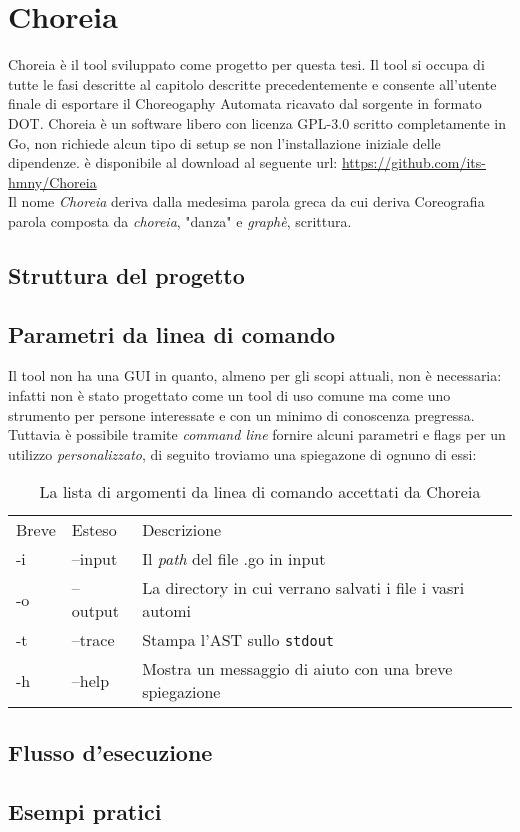 \chapter{Choreia}
Choreia è il tool sviluppato come progetto per questa tesi. Il tool si occupa di tutte le fasi descritte al capitolo descritte precedentemente e consente all'utente finale di esportare il Choreogaphy Automata ricavato dal sorgente in formato DOT.
Choreia è un software libero con licenza GPL-3.0 scritto completamente in Go, non richiede alcun tipo di setup se non l'installazione iniziale delle dipendenze. è disponibile al download al seguente url: \url{https://github.com/its-hmny/Choreia} \\
Il nome \emph{Choreia} deriva dalla medesima parola greca da cui deriva Coreografia parola composta da \emph{choreia}, "danza" e \emph{graphè}, scrittura.

\section{Struttura del progetto}

\section{Parametri da linea di comando}
Il tool non ha una GUI in quanto, almeno per gli scopi attuali, non è necessaria: infatti non è stato progettato come un tool di uso comune ma come uno strumento per persone interessate e con un minimo di conoscenza pregressa.\\
Tuttavia è possibile tramite \emph{command line} fornire alcuni parametri e flags per un utilizzo \emph{personalizzato}, di seguito troviamo una spiegazone di ognuno di essi:
\begin{table}[h!]
    \centering
    \begin{tabular}{l l l}
        Breve & Esteso   & Descrizione                                               \\
        -i    & --input  & Il \emph{path} del file .go in input                      \\
        -o    & --output & La directory in cui verrano salvati i file i vasri automi \\
        -t    & --trace  & Stampa l'AST sullo \texttt{stdout}                       \\
        -h    & --help   & Mostra un messaggio di aiuto con una breve spiegazione    \\
    \end{tabular}
    \caption{La lista di argomenti da linea di comando  accettati da Choreia}
\end{table}

\section{Flusso d'esecuzione}

\section{Esempi pratici}
